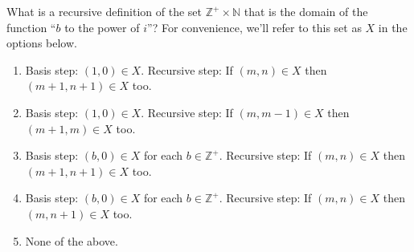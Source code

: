 
What is a recursive definition of the set
$\mathbb{Z}^+ \times \mathbb{N}$ that is the domain of the 
function ``$b$ to the power of $i$''?
For convenience, we'll refer to this set as $X$ 
in the options below.

\begin{enumerate}[labelindent=-10pt, leftmargin=-10pt]
    \item[] Basis step: $(1,0) \in X$. Recursive step: If $(m,n) \in X$ then $(m+1, n+1) \in X$ too.
    \item[] Basis step: $(1,0) \in X$. Recursive step: If $(m,m-1) \in X$ then $(m+1, m) \in X$ too.
    \item[] Basis step: $(b,0) \in X$ for each $b \in \mathbb{Z}^+$. Recursive step: If $(m,n) \in X$ then $(m+1, n+1) \in X$ too.
    \item[] Basis step: $(b,0) \in X$ for each $b \in \mathbb{Z}^+$. Recursive step: If $(m,n) \in X$ then $(m, n+1) \in X$ too.
    \item[] None of the above.
\end{enumerate}